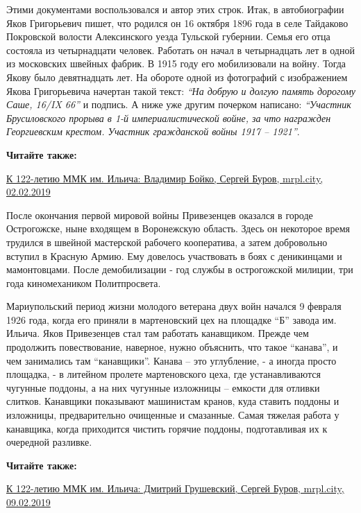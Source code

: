 
Этими документами воспользовался и автор этих строк. Итак, в автобиографии Яков
Григорьевич пишет, что родился он 16 октября 1896 года в селе Тайдаково
Покровской волости Алексинского уезда Тульской губернии. Семья его отца
состояла из четырнадцати человек. Работать он начал в четырнадцать лет в одной
из московских швейных фабрик. В 1915 году его мобилизовали на войну. Тогда
Якову было девятнадцать лет. На обороте одной из фотографий с изображением
Якова Григорьевича начертан такой текст: \emph{\enquote{На добрую и долгую память дорогому
Саше, 16/IX 66}} и подпись. А ниже уже другим почерком написано: \emph{\enquote{Участник
Брусиловского прорыва в 1-й империалистической войне, за что награжден
Георгиевским крестом. Участник гражданской войны 1917 – 1921}}. 

\textbf{Читайте также:} 

\href{https://archive.org/details/02_02_2019.sergij_burov.mrpl_city.k_122_letiu_mkk_im_iljicha_vladimir_bojko}{%
К 122-летию ММК им. Ильича: Владимир Бойко, Сергей Буров, mrpl.city, 02.02.2019}

После окончания первой мировой войны Привезенцев оказался в городе Острогожске,
ныне входящем в Воронежскую область. Здесь он некоторое время трудился в
швейной мастерской рабочего кооператива, а затем добровольно вступил в Красную
Армию. Ему довелось участвовать в боях с деникинцами и мамонтовцами. После
демобилизации - год службы в острогожской милиции, три года киномехаником
Политпросвета.

Мариупольский период жизни молодого ветерана двух войн начался 9 февраля 1926
года, когда его приняли в мартеновский цех на площадке \enquote{Б} завода им. Ильича.
Яков Привезенцев стал там работать канавщиком. Прежде чем продолжить
повествование, наверное, нужно объяснить, что такое \enquote{канава}, и чем занимались
там \enquote{канавщики}. Канава – это углубление, - а иногда просто площадка, - в
литейном пролете мартеновского цеха, где устанавливаются чугунные поддоны, а на
них чугунные изложницы – емкости для отливки слитков. Канавщики показывают
машинистам кранов, куда ставить поддоны и изложницы, предварительно очищенные и
смазанные. Самая тяжелая работа у канавщика, когда приходится чистить горячие
поддоны, подготавливая их к очередной разливке.

\vspace{0.5cm}
\begin{minipage}{0.9\textwidth}
\textbf{Читайте также:}

\href{https://archive.org/details/09_02_2019.sergij_burov.mrpl_city.k_122_letiu_mmk_im_iljicha_dmitrii_grushevskii}{%
К 122-летию ММК им. Ильича: Дмитрий Грушевский, Сергей Буров, mrpl.city, 09.02.2019}
\end{minipage}
\vspace{0.5cm}

